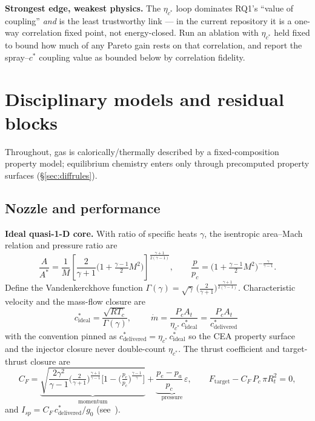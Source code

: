 \documentclass[11pt]{article}
\newcommand{\Rt}{R_t}
\newcommand{\mdot}{\dot m}
\newcommand{\cstar}{c^{*}}
\begin{document}
\begin{warnbox}
\textbf{Strongest edge, weakest physics.} The $\eta_{\cstar}$ loop dominates
RQ1's ``value of coupling'' \emph{and} is the least trustworthy link --- in the
current repository it is a one-way correlation fixed point, not energy-closed.
Run an ablation with $\eta_{\cstar}$ held fixed to bound how much of any Pareto
gain rests on that correlation, and report the spray--$\cstar$ coupling value as
bounded below by correlation fidelity.
\end{warnbox}

\section{Disciplinary models and residual blocks}
\label{sec:disc}

Throughout, gas is calorically/thermally described by a fixed-composition
property model; equilibrium chemistry enters only through precomputed property
surfaces (\S\ref{sec:diffrules}).

\subsection{Nozzle and performance}
\textbf{Ideal quasi-1-D core.} With ratio of specific heats $\gamma$, the
isentropic area--Mach relation and pressure ratio are
\begin{equation}
\frac{A}{A^{*}}=\frac{1}{M}\!\left[\frac{2}{\gamma+1}
\Big(1+\tfrac{\gamma-1}{2}M^{2}\Big)\right]^{\!\frac{\gamma+1}{2(\gamma-1)}},
\qquad
\frac{p}{p_c}=\Big(1+\tfrac{\gamma-1}{2}M^{2}\Big)^{-\frac{\gamma}{\gamma-1}} .
\end{equation}
Define the Vandenkerckhove function
$\Gamma(\gamma)=\sqrt{\gamma}\,\big(\tfrac{2}{\gamma+1}\big)^{\frac{\gamma+1}{2(\gamma-1)}}$.
Characteristic velocity and the mass-flow closure are
\begin{equation}
\cstar_\mathrm{ideal}=\frac{\sqrt{R T_c}}{\Gamma(\gamma)},
\qquad
\boxed{\;\mdot=\frac{P_c A_t}{\eta_{\cstar}\,\cstar_\mathrm{ideal}}
=\frac{P_c A_t}{\cstar_\mathrm{delivered}}\;}
\label{eq:mdot}
\end{equation}
with the convention pinned as $\cstar_\mathrm{delivered}=\eta_{\cstar}\,\cstar_\mathrm{ideal}$
so the CEA property surface and the injector closure never double-count
$\eta_{\cstar}$. The thrust coefficient and target-thrust closure are
\begin{equation}
C_F=\underbrace{\sqrt{\frac{2\gamma^{2}}{\gamma-1}
\Big(\tfrac{2}{\gamma+1}\Big)^{\frac{\gamma+1}{\gamma-1}}
\!\Big[1-\big(\tfrac{p_e}{p_c}\big)^{\frac{\gamma-1}{\gamma}}\Big]}}_{\text{momentum}}
+\underbrace{\frac{p_e-p_a}{p_c}\,\varepsilon}_{\text{pressure}},
\qquad
F_\mathrm{target}-C_F\,P_c\,\pi \Rt^{2}=0,
\label{eq:cf}
\end{equation}
and $I_{sp}=C_F\,\cstar_\mathrm{delivered}/g_0$ (see~\cite{sp125,anderson,sp8120}).
\end{document}
